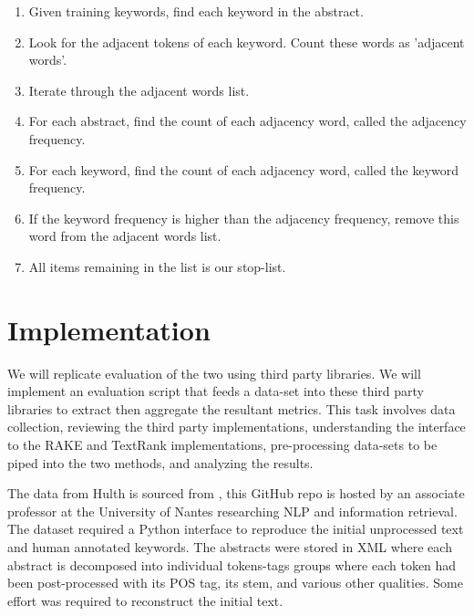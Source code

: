 \documentclass[11pt,a4paper]{article}
\begin{document}
\begin{enumerate}
	\small \itemsep0em 

	\item Given training keywords, find each keyword in the abstract.
	\item Look for the adjacent tokens of each keyword. Count these words as 'adjacent words'.
	\item Iterate through the adjacent words list.
	\item For each abstract, find the count of each adjacency word, called the adjacency frequency.
	\item For each keyword, find the count of each adjacency word, called the keyword frequency.
	\item If the keyword frequency is higher than the adjacency frequency, remove this word from the adjacent words list.
	\item All items remaining in the list is our stop-list. 

	\normalsize
\end{enumerate}

\section{Implementation}
We will replicate  evaluation of the two using third party libraries. We will implement an evaluation script that feeds a data-set into these third party libraries to extract then aggregate the resultant metrics. This task involves data collection, reviewing the third party implementations, understanding the interface to the RAKE and TextRank implementations, pre-processing data-sets to be piped into the two methods, and analyzing the results.

The data from Hulth is sourced from \citet{Boudin}, this GitHub repo is hosted by an associate professor at the University of Nantes researching NLP and information retrieval. The dataset required a Python interface to reproduce the initial unprocessed text and human annotated keywords. The abstracts were stored in XML where each abstract is decomposed into individual tokens-tags groups where each token had been post-processed with its POS tag, its stem, and various other qualities. Some effort was required to reconstruct the initial text.
\end{document}
